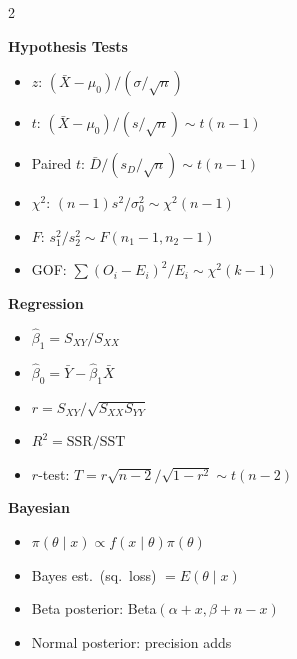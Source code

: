 \documentclass[12pt]{article}
\begin{document}
\begin{tcolorbox}[colback=lightbg,colframe=accent,arc=4pt,boxrule=1.5pt,
  left=10pt,right=10pt,top=8pt,bottom=8pt]
\begin{multicols}{2}
\columnbreak

\textbf{\color{primary}Hypothesis Tests}
\begin{itemize}[noitemsep,leftmargin=*,topsep=2pt]
  \item $z$: $(\bar X-\mu_0)/(\sigma/\sqrt n)$
  \item $t$: $(\bar X-\mu_0)/(s/\sqrt n)\sim t(n-1)$
  \item Paired $t$: $\bar D/(s_D/\sqrt n)\sim t(n-1)$
  \item $\chi^2$: $(n-1)s^2/\sigma_0^2\sim\chi^2(n-1)$
  \item $F$: $s_1^2/s_2^2\sim F(n_1-1,n_2-1)$
  \item GOF: $\sum(O_i-E_i)^2/E_i\sim\chi^2(k-1)$
\end{itemize}

\medskip
\textbf{\color{primary}Regression}
\begin{itemize}[noitemsep,leftmargin=*,topsep=2pt]
  \item $\hat\beta_1=S_{XY}/S_{XX}$
  \item $\hat\beta_0=\bar Y-\hat\beta_1\bar X$
  \item $r=S_{XY}/\sqrt{S_{XX}S_{YY}}$
  \item $R^2=\text{SSR}/\text{SST}$
  \item $r$-test: $T=r\sqrt{n-2}/\sqrt{1-r^2}\sim t(n-2)$
\end{itemize}

\medskip
\textbf{\color{primary}Bayesian}
\begin{itemize}[noitemsep,leftmargin=*,topsep=2pt]
  \item $\pi(\theta\mid x)\propto f(x\mid\theta)\pi(\theta)$
  \item Bayes est.\ (sq.\ loss) $=E(\theta\mid x)$
  \item Beta posterior: Beta$(\alpha+x,\beta+n-x)$
  \item Normal posterior: precision adds
\end{itemize}
\end{multicols}
\end{tcolorbox}
\end{document}
